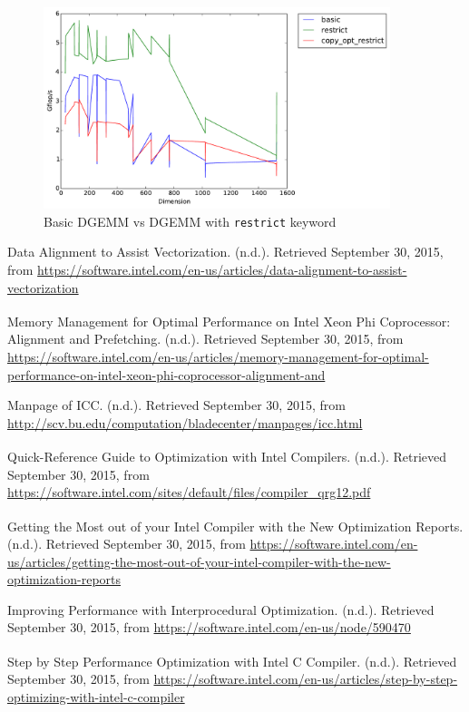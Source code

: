 \documentclass[11pt]{article}
\theoremstyle{plain}
\theoremstyle{definition}
\begin{document}
\begin{figure}[H]
    \includegraphics[width=0.9\textwidth]{timing_copy_opt_restrict.pdf}
    \caption{Basic DGEMM vs DGEMM with \texttt{restrict} keyword}
    \label{restrict_copy_opt}
\end{figure} 


\begin{thebibliography}{9}
Data Alignment to Assist Vectorization. (n.d.). Retrieved September 30, 2015, from \url{https://software.intel.com/en-us/articles/data-alignment-to-assist-vectorization}
 
Memory Management for Optimal Performance on Intel\textsuperscript{\textregistered} Xeon Phi\textsuperscript{\texttrademark} Coprocessor: Alignment and Prefetching. (n.d.). Retrieved September 30, 2015, from \url{https://software.intel.com/en-us/articles/memory-management-for-optimal-performance-on-intel-xeon-phi-coprocessor-alignment-and}

Manpage of ICC. (n.d.). Retrieved September 30, 2015, from \url{http://scv.bu.edu/computation/bladecenter/manpages/icc.html}
 
Quick-Reference Guide to Optimization with Intel\textsuperscript{\textregistered} Compilers. (n.d.). Retrieved September 30, 2015, from \url{https://software.intel.com/sites/default/files/compiler_qrg12.pdf}

Getting the Most out of your Intel\textsuperscript{\textregistered} Compiler with the New Optimization Reports. (n.d.). Retrieved September 30, 2015, from \url{https://software.intel.com/en-us/articles/getting-the-most-out-of-your-intel-compiler-with-the-new-optimization-reports}

Improving Performance with Interprocedural Optimization. (n.d.). Retrieved September 30, 2015, from \url{https://software.intel.com/en-us/node/590470}

Step by Step Performance Optimization with Intel\textsuperscript{\textregistered} C Compiler. (n.d.). Retrieved September 30, 2015, from \url{https://software.intel.com/en-us/articles/step-by-step-optimizing-with-intel-c-compiler}



\end{thebibliography}

 
 
\end{document}
